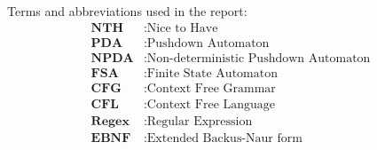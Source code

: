 
Terms and abbreviations used in the report:
\begin{align*}
    \textbf{NTH} &: \text{Nice to Have} \\
    \textbf{PDA} &: \text{Pushdown Automaton} \\
    \textbf{NPDA} &: \text{Non-deterministic Pushdown Automaton} \\
    \textbf{FSA} &: \text{Finite State Automaton} \\
    \textbf{CFG} &: \text{Context Free Grammar} \\
    \textbf{CFL} &: \text{Context Free Language} \\
    \textbf{Regex} &: \text{Regular Expression} \\
    \textbf{EBNF} &: \text{Extended Backus-Naur form} \\
\end{align*}